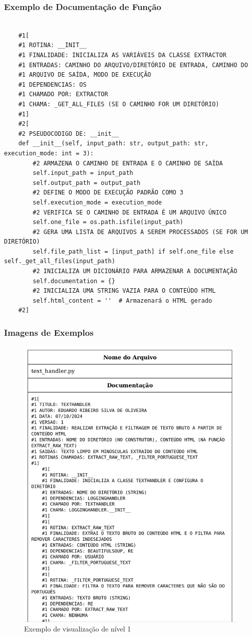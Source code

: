 \documentclass{beamer}
\begin{document}
\begin{frame}[fragile]
  \frametitle{Exemplo de Documentação de Função}
  \tiny
  \begin{verbatim}

    #1[
    #1 ROTINA: __INIT__
    #1 FINALIDADE: INICIALIZA AS VARIÁVEIS DA CLASSE EXTRACTOR
    #1 ENTRADAS: CAMINHO DO ARQUIVO/DIRETÓRIO DE ENTRADA, CAMINHO DO 
    #1 ARQUIVO DE SAÍDA, MODO DE EXECUÇÃO
    #1 DEPENDENCIAS: OS
    #1 CHAMADO POR: EXTRACTOR
    #1 CHAMA: _GET_ALL_FILES (SE O CAMINHO FOR UM DIRETÓRIO)
    #1]
    #2[
    #2 PSEUDOCODIGO DE: __init__
    def __init__(self, input_path: str, output_path: str, execution_mode: int = 3):
        #2 ARMAZENA O CAMINHO DE ENTRADA E O CAMINHO DE SAÍDA
        self.input_path = input_path
        self.output_path = output_path
        #2 DEFINE O MODO DE EXECUÇÃO PADRÃO COMO 3
        self.execution_mode = execution_mode
        #2 VERIFICA SE O CAMINHO DE ENTRADA É UM ARQUIVO ÚNICO
        self.one_file = os.path.isfile(input_path)
        #2 GERA UMA LISTA DE ARQUIVOS A SEREM PROCESSADOS (SE FOR UM DIRETÓRIO)
        self.file_path_list = [input_path] if self.one_file else self._get_all_files(input_path)
        #2 INICIALIZA UM DICIONÁRIO PARA ARMAZENAR A DOCUMENTAÇÃO
        self.documentation = {}
        #2 INICIALIZA UMA STRING VAZIA PARA O CONTEÚDO HTML
        self.html_content = ''  # Armazenará o HTML gerado
    #2]

  \end{verbatim}
  \normalsize
\end{frame}

\begin{frame}
  \frametitle{Imagens de Exemplos}
  \begin{figure}
    \centering
    \includegraphics[width=0.7\linewidth]{nivel1.png}
    \caption{Exemplo de visualização de nível 1}
  \end{figure}
\end{frame}
\end{document}

